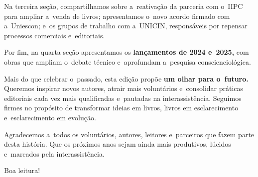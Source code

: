 \documentclass{gescons}
\begin{document}
\begin{multicols}{2}
Na terceira seção, compartilhamos sobre a~reativação da parceria com o~IIPC para ampliar a~venda de livros; apresentamos o~novo acordo firmado com a~Uniescon; e~os grupos de trabalho com a~UNICIN, responsáveis por repensar processos comerciais e~editoriais.

Por fim, na quarta seção apresentamos os \textbf{lançamentos de 2024 e~2025,} com obras que ampliam o~debate técnico e~aprofundam a~pesquisa conscienciológica.

Mais do que celebrar o~passado, esta edição propõe \textbf{um olhar para o~futuro.} Queremos inspirar novos autores, atrair mais voluntários e~consolidar práticas editoriais cada vez mais qualificadas e~pautadas na interassistência. Seguimos firmes no propósito de transformar ideias em livros, livros em esclarecimento e~esclarecimento em evolução.

Agradecemos a~todos os voluntários, autores, leitores e~parceiros que fazem parte desta história. Que os próximos anos sejam ainda mais produtivos, lúcidos e~marcados pela interassistência.

Boa leitura!



        
    \end{multicols}

\end{document}

